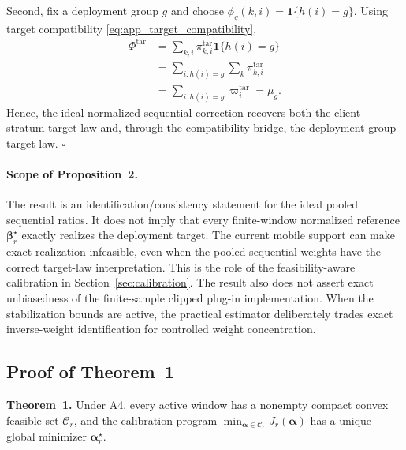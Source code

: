 Second, fix a deployment group $g$ and choose
$\phi_g(k,i)=\mathbf{1}\{h(i)=g\}$.
Using target compatibility
\eqref{eq:app_target_compatibility},
\begin{align}
 \Phi^{\mathrm{tar}}
 &=
 \sum_{k,i}
 \pi^{\mathrm{tar}}_{k,i}
 \mathbf{1}\{h(i)=g\}
 \nonumber\\
 &=
 \sum_{i:h(i)=g}
 \sum_k
 \pi^{\mathrm{tar}}_{k,i}
 \nonumber\\
 &=
 \sum_{i:h(i)=g}
 \varpi_i^{\mathrm{tar}}
 =
 \mu_g.
 \label{eq:app_recover_group}
\end{align}
Hence, the ideal normalized sequential correction recovers both the
client--stratum target law and, through the compatibility bridge, the
deployment-group target law. \hfill$\square$

\paragraph{Scope of Proposition~2.}
The result is an identification/consistency statement for the ideal pooled
sequential ratios.  It does not imply that every finite-window normalized
reference $\boldsymbol\beta_r^\star$ exactly realizes the deployment target.
The current mobile support can make exact realization infeasible, even when
the pooled sequential weights have the correct target-law interpretation.  This
is the role of the feasibility-aware calibration in
Section~\ref{sec:calibration}.  The result also does not assert exact
unbiasedness of the finite-sample clipped plug-in implementation.  When the
stabilization bounds are active, the practical estimator deliberately trades
exact inverse-weight identification for controlled weight concentration.


\subsection{Proof of Theorem~1}
\label{app:proof_theorem1}

\noindent\textbf{Theorem~1.}
Under A4, every active window has a nonempty compact convex feasible set
$\mathcal{C}_r$, and the calibration program
$\min_{\boldsymbol\alpha\in\mathcal{C}_r}J_r(\boldsymbol\alpha)$
has a unique global minimizer $\boldsymbol\alpha_r^\star$.

